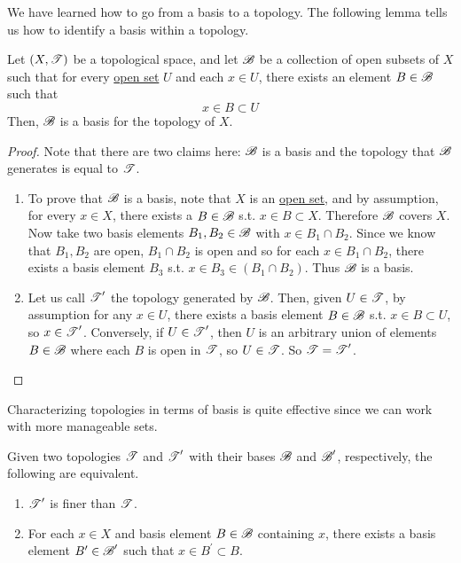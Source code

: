   We have learned how to go from a basis to a topology. The following lemma tells us how to identify a basis within a topology. 

  \begin{theorem}
    \label{thm:topology-to-basis}
    Let $(X, \operatorname{\mathscr{T}})$ be a topological space, and let $\operatorname{\mathscr{B}}$ be a collection of open subsets of $X$ such that for every \hyperref[def:open-set]{open set} $U$ and each $x \in U$, there exists an element $B \in \operatorname{\mathscr{B}}$ such that
    \begin{equation}
      x \in B \subset U
    \end{equation}
    Then, $\operatorname{\mathscr{B}}$ is a basis for the topology of $X$. 
  \end{theorem}
  \begin{proof}
    Note that there are two claims here: $\operatorname{\mathscr{B}}$ is a basis and the topology that $\operatorname{\mathscr{B}}$ generates is equal to $\operatorname{\mathscr{T}}$. 
    \begin{enumerate}
      \item To prove that $\operatorname{\mathscr{B}}$ is a basis, note that $X$ is an \hyperref[def:open-set]{open set}, and by assumption, for every $x \in X$, there exists a $B \in \operatorname{\mathscr{B}}$ s.t. $x \in B \subset X$. Therefore $\operatorname{\mathscr{B}}$ covers $X$. Now take two basis elements $B_1, B_2 \in \operatorname{\mathscr{B}}$ with $x \in B_1 \cap B_2$. Since we know that $B_1, B_2$ are open, $B_1 \cap B_2$ is open and so for each $x \in B_1 \cap B_2$, there exists a basis element $B_3$ s.t. $x \in B_3 \in (B_1 \cap B_2)$. Thus $\operatorname{\mathscr{B}}$ is a basis. 

      \item Let us call $\operatorname{\mathscr{T}}^\prime$ the topology generated by $\operatorname{\mathscr{B}}$. Then, given $U \in \operatorname{\mathscr{T}}$, by assumption for any $x \in U$, there exists a basis element $B \in \operatorname{\mathscr{B}}$ s.t. $x \in B \subset U$, so $x \in \operatorname{\mathscr{T}}^\prime$. Conversely, if $U \in \operatorname{\mathscr{T}}^\prime$, then $U$ is an arbitrary union of elements $B \in \operatorname{\mathscr{B}}$ where each $B$ is open in $\operatorname{\mathscr{T}}$, so $U \in \operatorname{\mathscr{T}}$. So $\operatorname{\mathscr{T}} = \operatorname{\mathscr{T}}^\prime$. 
    \end{enumerate}
  \end{proof} 

  Characterizing topologies in terms of basis is quite effective since we can work with more manageable sets. 

  \begin{lemma}
    \label{thm:fineness-w-r-t-basis}
    Given two topologies $\operatorname{\mathscr{T}}$ and $\operatorname{\mathscr{T}}^\prime$ with their bases $\operatorname{\mathscr{B}}$ and $\operatorname{\mathscr{B}}^\prime$, respectively, the following are equivalent. 
    \begin{enumerate}
      \item $\operatorname{\mathscr{T}}^\prime$ is finer than $\operatorname{\mathscr{T}}$. 
      \item For each $x \in X$ and basis element $B \in \operatorname{\mathscr{B}}$ containing $x$, there exists a basis element $B^\prime \in \operatorname{\mathscr{B}}^\prime$ such that $x \in B^\prime \subset B$. 
    \end{enumerate}
  \end{lemma}

